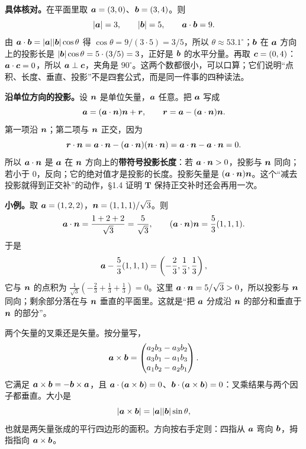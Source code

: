 \documentclass[11pt]{ctexart}
\newcommand{\ten}[1]{\mathbf{#1}}
\let\origsubhdr\subhdr
\renewcommand{\subhdr}[1]{\par\needspace{3\baselineskip}\origsubhdr{#1}}
\begin{document}
\textbf{具体核对。}在平面里取 $\boldsymbol{a}=(3,0)$、$\boldsymbol{b}=(3,4)$。则
\[
|\boldsymbol{a}|=3,\qquad |\boldsymbol{b}|=5,\qquad \boldsymbol{a}\cdot\boldsymbol{b}=9 .
\]
由 $\boldsymbol{a}\cdot\boldsymbol{b}=|\boldsymbol{a}||\boldsymbol{b}|\cos\theta$ 得 $\cos\theta=9/(3\cdot5)=3/5$，所以 $\theta\approx53.1^\circ$；$\boldsymbol{b}$ 在 $\boldsymbol{a}$ 方向上的投影长是 $|\boldsymbol{b}|\cos\theta=5\cdot(3/5)=3$，正好是 $\boldsymbol{b}$ 的水平分量。再取 $\boldsymbol{c}=(0,4)$：$\boldsymbol{a}\cdot\boldsymbol{c}=0$，所以 $\boldsymbol{a}\perp\boldsymbol{c}$，夹角是 $90^\circ$。这两个数都很小，可以口算；它们说明“点积、长度、垂直、投影”不是四套公式，而是同一件事的四种读法。

\textbf{沿单位方向的投影。}设 $\boldsymbol{n}$ 是单位矢量，$\boldsymbol{a}$ 任意。把 $\boldsymbol{a}$ 写成
\[
\boldsymbol{a}=(\boldsymbol{a}\cdot\boldsymbol{n})\boldsymbol{n}+\boldsymbol{r},
\qquad
\boldsymbol{r}=\boldsymbol{a}-(\boldsymbol{a}\cdot\boldsymbol{n})\boldsymbol{n} .
\]
第一项沿 $\boldsymbol{n}$；第二项与 $\boldsymbol{n}$ 正交，因为
\[
\boldsymbol{r}\cdot\boldsymbol{n}
=\boldsymbol{a}\cdot\boldsymbol{n}-(\boldsymbol{a}\cdot\boldsymbol{n})(\boldsymbol{n}\cdot\boldsymbol{n})
=\boldsymbol{a}\cdot\boldsymbol{n}-\boldsymbol{a}\cdot\boldsymbol{n}=0 .
\]
所以 $\boldsymbol{a}\cdot\boldsymbol{n}$ 是 $\boldsymbol{a}$ 在 $\boldsymbol{n}$ 方向上的\textbf{带符号投影长度}：若 $\boldsymbol{a}\cdot\boldsymbol{n}>0$，投影与 $\boldsymbol{n}$ 同向；若小于 $0$，反向；它的绝对值才是投影的长度。投影矢量是 $(\boldsymbol{a}\cdot\boldsymbol{n})\boldsymbol{n}$。这个“减去投影就得到正交补”的动作，\S1.4 证明 $\ten T$ 保持正交补时还会再用一次。

\textbf{小例。}取 $\boldsymbol{a}=(1,2,2)$，$\boldsymbol{n}=(1,1,1)/\sqrt3$。则
\[
\boldsymbol{a}\cdot\boldsymbol{n}=\frac{1+2+2}{\sqrt3}=\frac{5}{\sqrt3},
\qquad
(\boldsymbol{a}\cdot\boldsymbol{n})\boldsymbol{n}=\frac53(1,1,1).
\]
于是
\[
\boldsymbol{a}-\frac53(1,1,1)=\left(-\frac23,\frac13,\frac13\right),
\]
它与 $\boldsymbol{n}$ 的点积为 $\frac{1}{\sqrt3}(-\frac23+\frac13+\frac13)=0$。这里 $\boldsymbol{a}\cdot\boldsymbol{n}=5/\sqrt3>0$，所以投影与 $\boldsymbol{n}$ 同向；剩余部分落在与 $\boldsymbol{n}$ 垂直的平面里。这就是“把 $\boldsymbol{a}$ 分成沿 $\boldsymbol{n}$ 的部分和垂直于 $\boldsymbol{n}$ 的部分”。

\label{subsec:cross}

两个矢量的叉乘还是矢量。按分量写，
\[
\boldsymbol{a}\times\boldsymbol{b}=
\begin{pmatrix}
a_2b_3-a_3b_2\\
a_3b_1-a_1b_3\\
a_1b_2-a_2b_1
\end{pmatrix}.
\]
它满足 $\boldsymbol{a}\times\boldsymbol{b}=-\boldsymbol{b}\times\boldsymbol{a}$，且 $\boldsymbol{a}\cdot(\boldsymbol{a}\times\boldsymbol{b})=0$、$\boldsymbol{b}\cdot(\boldsymbol{a}\times\boldsymbol{b})=0$：叉乘结果与两个因子都垂直。大小是
\[
|\boldsymbol{a}\times\boldsymbol{b}|=|\boldsymbol{a}||\boldsymbol{b}|\sin\theta,
\]
也就是两矢量张成的平行四边形的面积。方向按右手定则：四指从 $\boldsymbol{a}$ 弯向 $\boldsymbol{b}$，拇指指向 $\boldsymbol{a}\times\boldsymbol{b}$。
\end{document}
